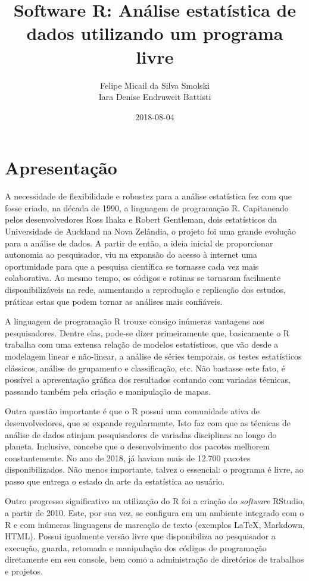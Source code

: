 \documentclass[12pt,brazil,oneside]{book}
\title{Software R: Análise estatística de dados utilizando um programa livre}
\author{Felipe Micail da Silva Smolski \\ Iara Denise Endruweit Battisti}
\date{2018-08-04}
\begin{document}
\maketitle

{
\setcounter{tocdepth}{1}
\tableofcontents
}
\hypertarget{apresentacao}{%
\chapter*{Apresentação}\label{apresentacao}}

A necessidade de flexibilidade e robustez para a análise estatística fez
com que fosse criado, na década de 1990, a linguagem de programação R.
Capitaneado pelos desenvolvedores Ross Ihaka e Robert Gentleman, dois
estatísticos da Universidade de Auckland na Nova Zelândia, o projeto foi
uma grande evolução para a análise de dados. A partir de então, a ideia
inicial de proporcionar autonomia ao pesquisador, viu na expansão do
acesso à internet uma oportunidade para que a pesquisa científica se
tornasse cada vez mais colaborativa. Ao mesmo tempo, os códigos e
rotinas se tornaram facilmente disponibilizáveis na rede, aumentando a
reprodução e replicação dos estudos, práticas estas que podem tornar as
análises mais confiáveis.

A linguagem de programação R trouxe consigo inúmeras vantagens aos
pesquisadores. Dentre elas, pode-se dizer primeiramente que, basicamente
o R trabalha com uma extensa relação de modelos estatísticos, que vão
desde a modelagem linear e não-linear, a análise de séries temporais, os
testes estatísticos clássicos, análise de grupamento e classificação,
etc. Não bastasse este fato, é possível a apresentação gráfica dos
resultados contando com variadas técnicas, passando também pela criação
e manipulação de mapas.

Outra questão importante é que o R possui uma comunidade ativa de
desenvolvedores, que se expande regularmente. Isto faz com que as
técnicas de análise de dados atinjam pesquisadores de variadas
disciplinas ao longo do planeta. Inclusive, concebe que o
desenvolvimento dos pacotes melhorem constantemente. No ano de 2018, já
haviam mais de 12.700 pacotes disponibilizados. Não menos importante,
talvez o essencial: o programa é livre, ao passo que entrega o estado da
arte da estatística ao usuário.

Outro progresso significativo na utilização do R foi a criação do
\emph{software} RStudio, a partir de 2010. Este, por sua vez, se
configura em um ambiente integrado com o R e com inúmeras linguagens de
marcação de texto (exemplos LaTeX, Markdown, HTML). Possui igualmente
versão livre que disponibiliza ao pesquisador a execução, guarda,
retomada e manipulação dos códigos de programação diretamente em seu
console, bem como a administração de diretórios de trabalhos e projetos.
\end{document}
